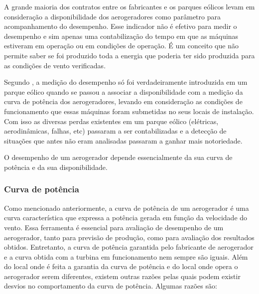 A grande maioria dos contratos entre os fabricantes e os parques eólicos levam em consideração a disponibilidade dos aerogeradores como parâmetro para acompanhamento do desempenho. Esse indicador não é efetivo para medir o desempenho e sim apenas uma contabilização do tempo em que as máquinas estiveram em operação ou em condições de operação. É um conceito que não permite saber se foi produzido toda a energia que poderia ter sido produzida para as condições de vento verificadas.

Segundo , a medição do desempenho só foi verdadeiramente introduzida em um parque eólico quando se passou a associar a disponibilidade com a medição da curva de potência dos aerogeradores, levando em consideração as condições de funcionamento que essas máquinas foram submetidas no seus locais de instalação. Com isso as diversas perdas existentes em um parque eólico (elétricas, aerodinâmicas, falhas, etc) passaram a ser contabilizadas e a detecção de situações que antes não eram analisadas passaram a ganhar mais notoriedade.

O desempenho de um aerogerador depende essencialmente da sua curva de potência e da sua disponibilidade. 

\subsubsection{Curva de potência}
\label{Sec:curvaPotenciaDesempenhoAerogeradores}

Como mencionado anteriormente, a curva de potência de um aerogerador é uma curva característica que expressa a potência gerada em função da velocidade do vento. Essa ferramenta é essencial para avaliação de desempenho de um aerogerador, tanto para previsão de produção, como para avaliação dos resultados obtidos. Entretanto, a curva de potência garantida pelo fabricante de aerogerador e a curva obtida com a turbina em funcionamento nem sempre são iguais. Além do local onde é feita a garantia da curva de potência e do local onde opera o aerogerador serem diferentes, existem outras razões pelas quais podem existir desvios no comportamento da curva de potência. Algumas razões são:

